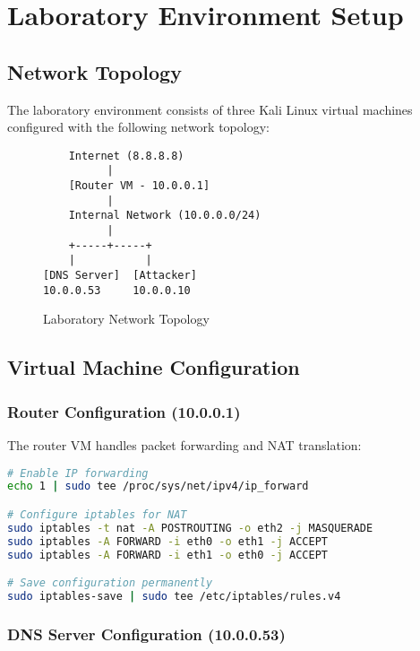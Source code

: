 \documentclass[12pt,a4paper]{article}
\begin{document}
\section{Laboratory Environment Setup}

\subsection{Network Topology}

The laboratory environment consists of three Kali Linux virtual machines configured with the following network topology:

\begin{figure}[H]
\centering
\begin{verbatim}
    Internet (8.8.8.8)
          |
    [Router VM - 10.0.0.1]
          |
    Internal Network (10.0.0.0/24)
          |
    +-----+-----+
    |           |
[DNS Server]  [Attacker]
10.0.0.53     10.0.0.10
\end{verbatim}
\caption{Laboratory Network Topology}
\end{figure}

\subsection{Virtual Machine Configuration}

\subsubsection{Router Configuration (10.0.0.1)}

The router VM handles packet forwarding and NAT translation:

\begin{lstlisting}[language=bash, caption=Router IP Forwarding Configuration]
# Enable IP forwarding
echo 1 | sudo tee /proc/sys/net/ipv4/ip_forward

# Configure iptables for NAT
sudo iptables -t nat -A POSTROUTING -o eth2 -j MASQUERADE
sudo iptables -A FORWARD -i eth0 -o eth1 -j ACCEPT
sudo iptables -A FORWARD -i eth1 -o eth0 -j ACCEPT

# Save configuration permanently
sudo iptables-save | sudo tee /etc/iptables/rules.v4
\end{lstlisting}

\subsubsection{DNS Server Configuration (10.0.0.53)}
\end{document}
